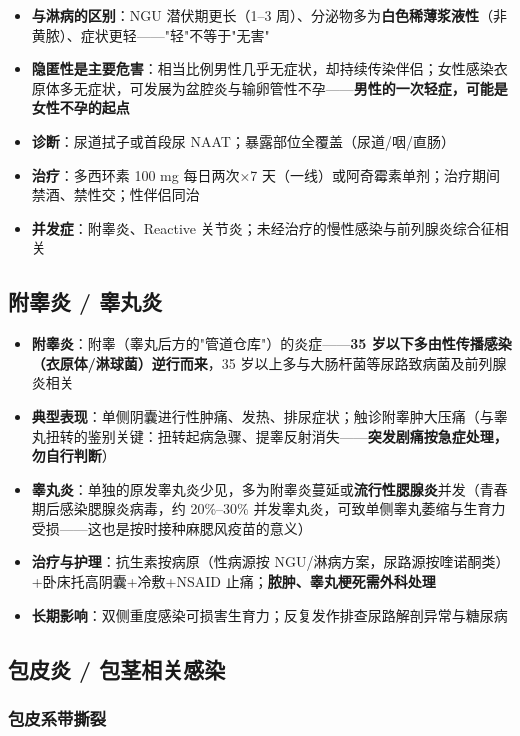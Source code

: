 \begin{itemize}
	\item \textbf{与淋病的区别}：NGU 潜伏期更长（1--3 周）、分泌物多为\textbf{白色稀薄浆液性}（非黄脓）、症状更轻——"轻"不等于"无害"
	\item \textbf{隐匿性是主要危害}：相当比例男性几乎无症状，却持续传染伴侣；女性感染衣原体多无症状，可发展为盆腔炎与输卵管性不孕——\textbf{男性的一次轻症，可能是女性不孕的起点}
	\item \textbf{诊断}：尿道拭子或首段尿 NAAT；暴露部位全覆盖（尿道/咽/直肠）
	\item \textbf{治疗}：多西环素 100 mg 每日两次×7 天（一线）或阿奇霉素单剂；治疗期间禁酒、禁性交；性伴侣同治
	\item \textbf{并发症}：附睾炎、Reactive 关节炎；未经治疗的慢性感染与前列腺炎综合征相关
\end{itemize}

\subsection{附睾炎 / 睾丸炎}


\begin{itemize}
	\item \textbf{附睾炎}：附睾（睾丸后方的"管道仓库"）的炎症——\textbf{35 岁以下多由性传播感染（衣原体/淋球菌）逆行而来}，35 岁以上多与大肠杆菌等尿路致病菌及前列腺炎相关
	\item \textbf{典型表现}：单侧阴囊进行性肿痛、发热、排尿症状；触诊附睾肿大压痛（与睾丸扭转的鉴别关键：扭转起病急骤、提睾反射消失——\textbf{突发剧痛按急症处理，勿自行判断}）
	\item \textbf{睾丸炎}：单独的原发睾丸炎少见，多为附睾炎蔓延或\textbf{流行性腮腺炎}并发（青春期后感染腮腺炎病毒，约 20\%--30\% 并发睾丸炎，可致单侧睾丸萎缩与生育力受损——这也是按时接种麻腮风疫苗的意义）
	\item \textbf{治疗与护理}：抗生素按病原（性病源按 NGU/淋病方案，尿路源按喹诺酮类）+卧床托高阴囊+冷敷+NSAID 止痛；\textbf{脓肿、睾丸梗死需外科处理}
	\item \textbf{长期影响}：双侧重度感染可损害生育力；反复发作排查尿路解剖异常与糖尿病
\end{itemize}

\subsection{包皮炎 / 包茎相关感染}

\subsubsection{包皮系带撕裂}

